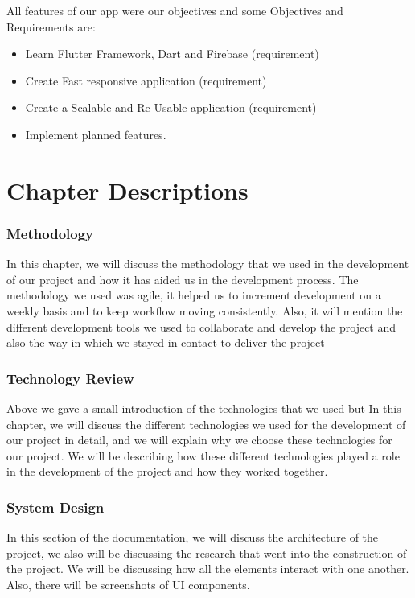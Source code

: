 All features of our app were our objectives and some Objectives and Requirements are:
\begin{itemize}
\item Learn Flutter Framework, Dart and Firebase (requirement)
\item Create Fast responsive application (requirement)
\item Create a Scalable and Re-Usable application (requirement)
\item Implement planned features.
\end{itemize}

\section{Chapter Descriptions}
\subsubsection{Methodology}
In this chapter, we will discuss the methodology that we used in the development of our project and how it has aided us in the development process. The methodology we used was agile, it helped us to increment development on a weekly basis and to keep workflow moving consistently. Also, it will mention the different development tools we used to collaborate and develop the project and also the way in which we stayed in contact to deliver the project

\subsubsection{Technology Review}
Above we gave a small introduction of the technologies that we used but
In this chapter, we will discuss the different technologies we used for the development of our project in detail, and we will explain why we choose these technologies for our project. We will be describing how these different technologies played a role in the development of the project and how they worked together.

\subsubsection{System Design} 
In this section of the documentation, we will discuss the architecture of the project, we also will be discussing the research that went into the construction of the project. We will be discussing how all the elements interact with one another. Also, there will be screenshots of UI components.

